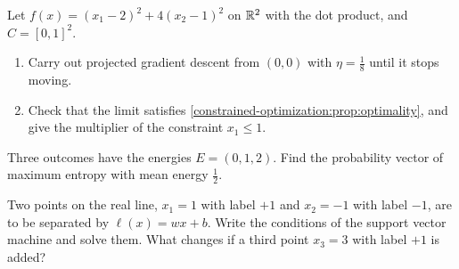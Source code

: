 \begin{notechapter}
\begin{exercise}\label{constrained-optimization:exr:7}
Let $f(x) = (x_1 - 2)^2 + 4(x_2 - 1)^2$ on $\mathbb{R}^2$ with the dot product,
and $C = [0, 1]^2$.
\begin{enumerate}[nosep]
  \item Carry out projected gradient descent from $(0, 0)$ with
        $\eta = \frac18$ until it stops moving.
  \item Check that the limit satisfies
        \cref{constrained-optimization:prop:optimality}, and give the
        multiplier of the constraint $x_1\leq1$.
\end{enumerate}
\end{exercise}

\begin{exercise}\label{constrained-optimization:exr:8}
Three outcomes have the energies $E = (0, 1, 2)$. Find the probability
vector of maximum entropy with mean energy $\frac12$.
\end{exercise}

\begin{exercise}\label{constrained-optimization:exr:9}
Two points on the real line, $x_1 = 1$ with label $+1$ and $x_2 = -1$
with label $-1$, are to be separated by $\ell(x) = wx + b$. Write the
conditions of the support vector machine and solve them. What changes if
a third point $x_3 = 3$ with label $+1$ is added?
\end{exercise}
\end{notechapter}
